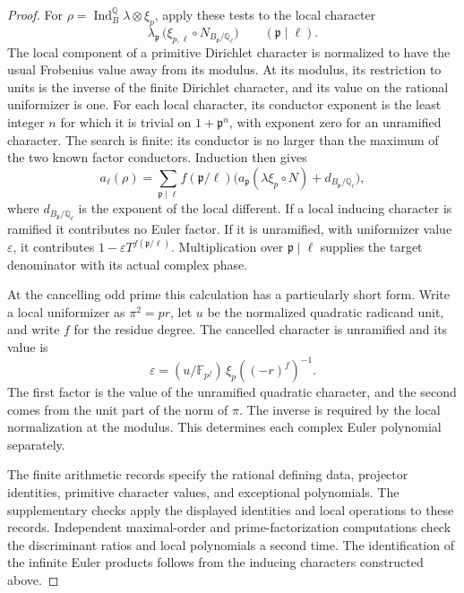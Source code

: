\begin{proof}
For $\rho=\operatorname{Ind}_{B}^{\mathbb Q}\lambda\otimes\xi_p$, apply
these tests to the local character
\[
 \lambda_{\mathfrak p}\,\bigl(\xi_{p,\ell}\circ
 N_{B_{\mathfrak p}/\mathbb Q_\ell}\bigr)
 \qquad(\mathfrak p\mid\ell).
\]
The local component of a primitive Dirichlet character is normalized to
have the usual Frobenius value away from its modulus. At its modulus,
its restriction to units is the inverse of the finite Dirichlet
character, and its value on the rational uniformizer is one.
For each local character, its conductor exponent is the least integer
$n$ for which it is trivial on $1+\mathfrak p^n$, with exponent zero
for an unramified character. The search is finite: its conductor is no
larger than the maximum of the two known factor conductors. Induction
then gives
\[
 a_\ell(\rho)=\sum_{\mathfrak p\mid\ell}
 f(\mathfrak p/\ell)\bigl(a_{\mathfrak p}(\lambda\xi_p\circ N)
                         +d_{B_{\mathfrak p}/\mathbb Q_\ell}\bigr),
\]
where $d_{B_{\mathfrak p}/\mathbb Q_\ell}$ is the exponent of the local
different. If a local inducing character is ramified it contributes no
Euler factor. If it is unramified, with uniformizer value $\varepsilon$,
it contributes $1-\varepsilon T^{f(\mathfrak p/\ell)}$. Multiplication over
$\mathfrak p\mid\ell$ supplies the target denominator with its actual
complex phase.

At the cancelling odd prime this calculation has a particularly short
form. Write a local uniformizer as $\pi^2=pr$, let $u$ be the normalized
quadratic radicand unit, and write $f$ for the residue degree. The
cancelled character is unramified and its value is
\begin{equation}\label{ar:cancelled-value}
 \varepsilon=(u/\mathbb F_{p^f})\,
       \xi_p((-r)^f)^{-1}.
\end{equation}
The first factor is the value of the unramified quadratic character,
and the second comes from the unit part of the norm of $\pi$. The
inverse is required by the local normalization at the modulus. This
determines each complex Euler polynomial separately.

The finite arithmetic records specify the rational defining data,
projector identities, primitive character values, and exceptional
polynomials. The supplementary checks apply the displayed identities
and local operations to these records. Independent maximal-order and
prime-factorization computations check the discriminant ratios and
local polynomials a second time. The identification of the infinite
Euler products follows from the inducing characters constructed above.
\end{proof}

